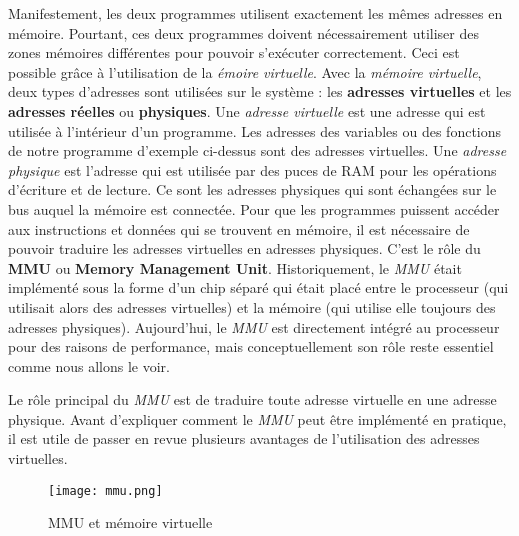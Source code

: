 Manifestement, les deux programmes utilisent exactement les mêmes
adresses en mémoire. Pourtant, ces deux programmes doivent
nécessairement utiliser des zones mémoires différentes pour pouvoir
s'exécuter correctement. Ceci est possible grâce à l'utilisation de la
\textit{émoire virtuelle}. Avec la \textit{mémoire virtuelle}, deux
types d'adresses sont utilisées sur le système : les \textbf{adresses
virtuelles} et les \textbf{adresses réelles} ou \textbf{physiques}. Une
\textit{adresse virtuelle} est une adresse qui est utilisée à
l'intérieur d'un programme. Les adresses des variables ou des fonctions
de notre programme d'exemple ci-dessus sont des adresses virtuelles.
Une \textit{adresse physique} est l'adresse qui est utilisée par des
puces de RAM pour les opérations d'écriture et de lecture. Ce sont les
adresses physiques qui sont échangées sur le bus auquel la mémoire est
connectée. Pour que les programmes puissent accéder aux instructions et
données qui se trouvent en mémoire, il est nécessaire de pouvoir
traduire les adresses virtuelles en adresses physiques. C'est le rôle
du \textbf{MMU} ou \textbf{Memory Management Unit}.
Historiquement, le \textit{MMU} était implémenté sous la forme
d'un chip séparé qui était placé entre le processeur (qui utilisait
alors des adresses virtuelles) et la mémoire (qui utilise elle toujours
des adresses physiques). Aujourd'hui, le \textit{MMU} est
directement intégré au processeur pour des raisons de performance, mais
conceptuellement son rôle reste essentiel comme nous allons le voir.
\newline
 
Le rôle principal du \textit{MMU} est de traduire toute adresse
virtuelle en une adresse physique. Avant d'expliquer comment le
\textit{MMU} peut être implémenté en pratique, il est utile de
passer en revue plusieurs avantages de l'utilisation des adresses
virtuelles.
 
\begin{figure}[!ht] 
    \centering
    \texttt{[image: mmu.png]}
    \caption{MMU et mémoire virtuelle}
\end{figure}
   
